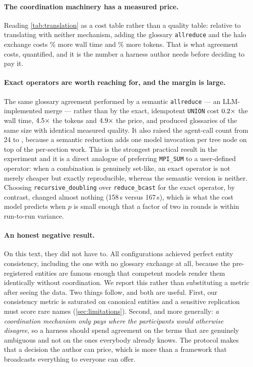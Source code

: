 \documentclass[10pt,twocolumn]{article}
\theoremstyle{definition}
\theoremstyle{plain}
\newcommand{\code}[1]{\texttt{\small #1}}
\begin{document}
\paragraph{The coordination machinery has a measured price.} Reading
\cref{tab:translation} as a cost table rather than a quality table: relative to
translating with neither mechanism, adding the glossary \code{allreduce} and the
halo exchange costs \NCoordTime\% more wall time and \NCoordTokens\% more tokens.
That is what agreement costs, quantified, and it is the number a harness author
needs before deciding to pay it.

\paragraph{Exact operators are worth reaching for, and the margin is large.} The
same glossary agreement performed by a semantic \code{allreduce} --- an
LLM-implemented merge --- rather than by the exact, idempotent \code{UNION} cost
$0.2\times$ the wall time, $4.5\times$ the tokens and
$4.9\times$ the price, and produced glossaries of the same size with
identical measured quality. It also raised the agent-call count from 24 to
\NSemCalls, because a semantic reduction adds one model invocation per tree node on
top of the per-section work. This is the strongest practical result in the
experiment and it is a direct analogue of preferring \code{MPI\_SUM} to a
user-defined operator: when a combination is genuinely set-like, an exact operator is
not merely cheaper but exactly reproducible, whereas the semantic version is neither.
Choosing \code{recursive\_doubling} over \code{reduce\_bcast} for the exact operator,
by contrast, changed almost nothing (158\,s versus 167\,s), which is what the cost
model predicts when $p$ is small enough that a factor of two in rounds is within
run-to-run variance.

\paragraph{An honest negative result.} On this text, they did not have to. All
configurations achieved perfect entity consistency, including the one with no
glossary exchange at all, because the pre-registered entities are famous enough
that competent models render them identically without coordination. We report this
rather than substituting a metric after seeing the data. Two things follow, and
both are useful. First, our consistency metric is saturated on canonical entities
and a sensitive replication must score rare names
(\cref{sec:limitations}). Second, and more generally: \emph{a coordination
mechanism only pays where the participants would otherwise disagree}, so a harness
should spend agreement on the terms that are genuinely ambiguous and not on the
ones everybody already knows. The protocol makes that a decision the author can
price, which is more than a framework that broadcasts everything to everyone can
offer.
\end{document}
